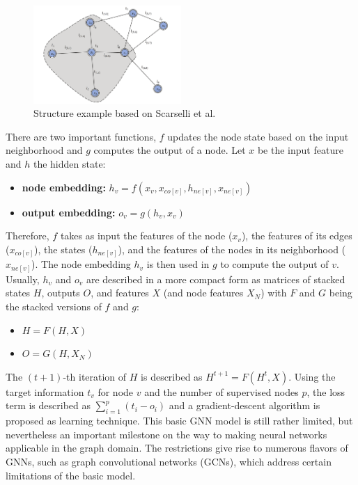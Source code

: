 \documentclass[a4paper,preprint]{sig-alternate}
\begin{document}
\begin{figure}[h]
    \centering
    \includegraphics[width=0.5\textwidth]{img/graph.png}
    \caption{Structure example based on Scarselli et al. \cite{Liu_2020}}
    \label{fig:graph}
\end{figure}

\vfill
\pagebreak

There are two important functions, $f$ updates the node state based on the input neighborhood and $g$ computes the output of a node.
Let $x$ be the input feature and $h$ the hidden state:
\begin{itemize}
    \item \textbf{node embedding:} $h_v = f(x_v, x_{co[v]}, h_{ne[v]}, x_{ne[v]})$
    \item \textbf{output embedding:} $o_v = g(h_v, x_v)$
\end{itemize}
Therefore, $f$ takes as input the features of the node ($x_v$), the features of its edges ($x_{co[v]}$), the states ($h_{ne[v]}$),
and the features of the nodes in its neighborhood ($x_{ne[v]}$). The node embedding $h_v$ is then used in $g$ to compute the output of $v$.
Usually, $h_v$ and $o_v$ are described in a more compact form as matrices of stacked states $H$,
outputs $O$, and features $X$ (and node features $X_N$) with $F$ and $G$ being the stacked versions of $f$ and $g$:
\begin{itemize}
    \item $H = F(H, X)$
    \item $O = G(H, X_N)$
\end{itemize}
The $(t + 1)$-th iteration of $H$ is described as $H^{t + 1} = F(H^t, X)$.
Using the target information $t_v$ for node $v$ and the number of supervised nodes $p$, 
the loss term is described as $\sum_{i=1}^p (t_i - o_i)$ and a gradient-descent algorithm is proposed as learning technique.\newline
This basic GNN model is still rather limited, but nevertheless an important milestone on the way to making
neural networks applicable in the graph domain. \cite{Liu_2020}
The restrictions give rise to numerous flavors of GNNs, such as graph convolutional networks (GCNs),
which address certain limitations of the basic model.\newline
\end{document}

